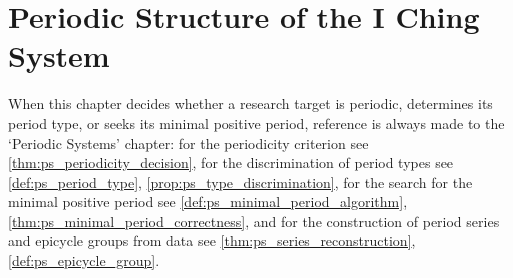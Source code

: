 \chapter{Periodic Structure of the I Ching System}
\label{chap:yijing-periodic}

\begin{remark}\label{rem:yijing_ps_hook}
When this chapter decides whether a research target is periodic, determines its period type, or seeks its minimal positive period, reference is always made to the `Periodic Systems' chapter:
for the periodicity criterion see \cref{thm:ps_periodicity_decision},
for the discrimination of period types see \cref{def:ps_period_type}, \cref{prop:ps_type_discrimination},
for the search for the minimal positive period see \cref{def:ps_minimal_period_algorithm}, \cref{thm:ps_minimal_period_correctness},
and for the construction of period series and epicycle groups from data see \cref{thm:ps_series_reconstruction}, \cref{def:ps_epicycle_group}.
\end{remark}

